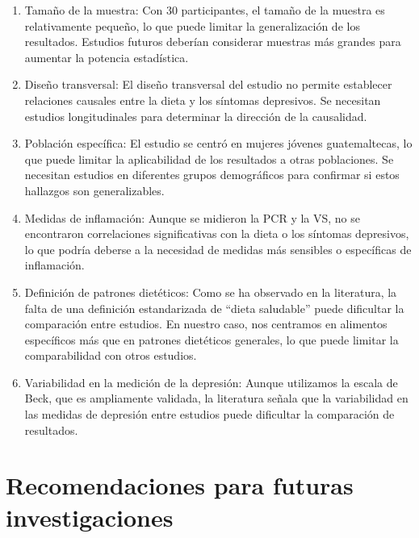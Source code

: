 \documentclass[stu, 12pt]{apa7}
\begin{document}
	\begin{enumerate}
		\item Tamaño de la muestra: Con 30 participantes, el tamaño de la muestra es relativamente pequeño, lo que puede limitar la generalización de los resultados. Estudios futuros deberían considerar muestras más grandes para aumentar la potencia estadística.
		\item Diseño transversal: El diseño transversal del estudio no permite establecer relaciones causales entre la dieta y los síntomas depresivos. Se necesitan estudios longitudinales para determinar la dirección de la causalidad.
		\item Población específica: El estudio se centró en mujeres jóvenes guatemaltecas, lo que puede limitar la aplicabilidad de los resultados a otras poblaciones. Se necesitan estudios en diferentes grupos demográficos para confirmar si estos hallazgos son generalizables.
		\item Medidas de inflamación: Aunque se midieron la PCR y la VS, no se encontraron correlaciones significativas con la dieta o los síntomas depresivos, lo que podría deberse a la necesidad de medidas más sensibles o específicas de inflamación.
		\item Definición de patrones dietéticos: Como se ha observado en la literatura, la falta de una definición estandarizada de ``dieta saludable'' puede dificultar la comparación entre estudios. En nuestro caso, nos centramos en alimentos específicos más que en patrones dietéticos generales, lo que puede limitar la comparabilidad con otros estudios.
		\item Variabilidad en la medición de la depresión: Aunque utilizamos la escala de Beck, que es ampliamente validada, la literatura señala que la variabilidad en las medidas de depresión entre estudios puede dificultar la comparación de resultados.
	\end{enumerate}


	\section{Recomendaciones para futuras investigaciones}\label{recomendaciones-para-futuras-investigaciones}
\end{document}
